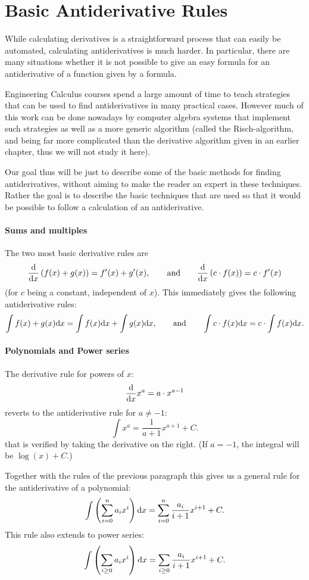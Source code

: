 \section{Basic Antiderivative Rules}

While calculating derivatives is a straightforward process that can easily
be automated, calculating antiderivatives is much harder. In particular,
there are many situations whether it is not possible to give an easy formula
for an antiderivative of a function given by a formula.

Engineering Calculus courses spend a large amount of time to teach
strategies that can be used to find antiderivatives in many practical cases.
However much of this work can be done nowadays by
computer algebra systems that implement such strategies as well as
a more generic algorithm (called
the Risch-algorithm, and being far more complicated than the derivative
algorithm given in an earlier chapter, thus we will not study it here).

Our goal thus will be just to describe some of the basic methods for finding
antiderivatives, without aiming to make the reader an expert in these
techniques. Rather the goal is to describe the basic techniques that are
used so that it would be possible to follow a calculation of an
antiderivative.

\paragraph{Sums and multiples}

The two most basic  derivative rules are
\[
\frac{\mbox{d}}{\mbox{d}x} \left(f(x)+g(x)\right)=f'(x)+g'(x),\qquad\mbox{and}\qquad
\frac{\mbox{d}}{\mbox{d}x} \left(c\cdot f(x)\right)=c\cdot f'(x)
\]
(for $c$ being a constant, independent of $x$). This immediately gives the
following antiderivative rules:
\[
\int f(x)+g(x){\mbox{d}}x=\int f(x){\mbox{d}}x+\int g(x){\mbox{d}}x,\qquad\mbox{and}\qquad
\int c\cdot f(x){\mbox{d}}x=c\cdot \int f(x){\mbox{d}}x.
\]

\paragraph{Polynomials and Power series}

The derivative rule for powers of $x$:
\[
\frac{\mbox{d}}{\mbox{d}x} x^a=a\cdot x^{a-1}
\]
reverts to the antiderivative rule for $a\not=-1$:
\[
\int x^a=\frac{1}{a+1}x^{a+1}+C.
\]
that is verified by taking the derivative on the right. (If $a=-1$, the
integral will be $\log(x)+C$.)

Together with the rules of the previous paragraph this gives us a general
rule for the antiderivative of a polynomial:
\[
\int\left( \sum_{i=0}^n a_i x^i\right){\mbox{d}}x=
\sum_{i=0}^n \frac{a_i}{i+1} x^{i+1}+C.
\]
This rule also extends to power series:
\[
\int\left( \sum_{i\ge 0} a_i x^i\right){\mbox{d}}x=
\sum_{i\ge 0} \frac{a_i}{i+1} x^{i+1}+C.
\]

